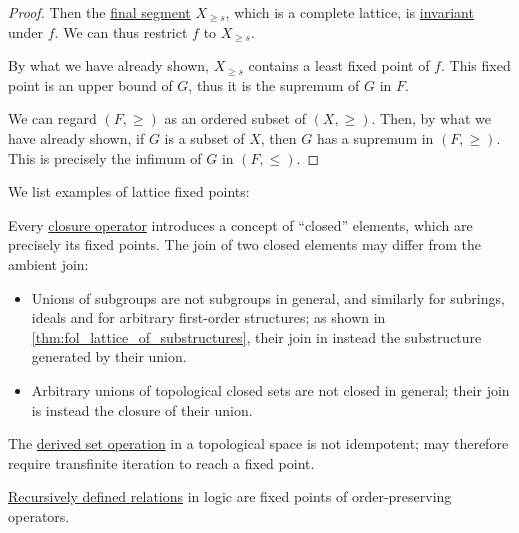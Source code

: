 \begin{proof}
  Then the \hyperref[def:order_interval/unbounded]{final segment} \( X_{\geq s} \), which is a complete lattice, is \hyperref[def:invariant_subset]{invariant} under \( f \). We can thus restrict \( f \) to \( X_{\geq s} \).

  By what we have already shown, \( X_{\geq s} \) contains a least fixed point of \( f \). This fixed point is an upper bound of \( G \), thus it is the supremum of \( G \) in \( F \).

   We can regard \( (F, \geq) \) as an ordered subset of \( (X, \geq) \). Then, by what we have already shown, if \( G \) is a subset of \( X \), then \( G \) has a supremum in \( (F, \geq) \). This is precisely the infimum of \( G \) in \( (F, \leq) \).
\end{proof}

\begin{example}\label{ex:thm:knaster_tarski}
  We list examples of lattice fixed points:
  \begin{thmenum}
     Every \hyperref[def:abstract_closure_operator]{closure operator} introduces a concept of \enquote{closed} elements, which are precisely its fixed points. The join of two closed elements may differ from the ambient join:
    \begin{itemize}
      \item Unions of subgroups are not subgroups in general, and similarly for subrings, ideals and for arbitrary first-order structures; as shown in \cref{thm:fol_lattice_of_substructures}, their join in instead the substructure generated by their union.
      \item Arbitrary unions of topological closed sets are not closed in general; their join is instead the closure of their union.
    \end{itemize}

     The \hyperref[def:derived_set]{derived set operation} in a topological space is not idempotent;  may therefore require transfinite iteration to reach a fixed point.

     \hyperref[thm:recursively_defined_relations]{Recursively defined relations} in logic are fixed points of order-preserving operators.
  \end{thmenum}
\end{example}

